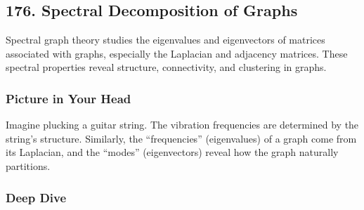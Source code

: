 \documentclass[
  letterpaper,
  DIV=11,
  numbers=noendperiod]{scrreprt}
\begin{document}
\subsection{176. Spectral Decomposition of
Graphs}\label{spectral-decomposition-of-graphs}

Spectral graph theory studies the eigenvalues and eigenvectors of
matrices associated with graphs, especially the Laplacian and adjacency
matrices. These spectral properties reveal structure, connectivity, and
clustering in graphs.

\subsubsection{Picture in Your Head}\label{picture-in-your-head-175}

Imagine plucking a guitar string. The vibration frequencies are
determined by the string's structure. Similarly, the ``frequencies''
(eigenvalues) of a graph come from its Laplacian, and the ``modes''
(eigenvectors) reveal how the graph naturally partitions.

\subsubsection{Deep Dive}\label{deep-dive-175}
\end{document}
